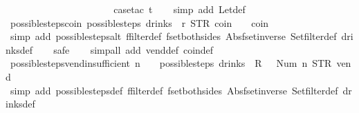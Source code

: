 \begin{isabellebody}
\ \ \ \ \ \ \ \ \ \ \ \ \ \ \ \ \ \ {\isacharparenright}{\isachardoublequoteclose}\isanewline
%
\isadelimproof
\ \ %
\endisadelimproof
%
\isatagproof
{}\isamarkupfalse%
\ {\isacharparenleft}case{\isacharunderscore}tac\ t{\isacharparenright}\isanewline
\ \ \isamarkupfalse%
\ {\isacharparenleft}simp\ add{\isacharcolon}\ Let{\isacharunderscore}def{\isacharparenright}%
\endisatagproof
{\isafoldproof}%
%
\isadelimproof
\isanewline
%
\endisadelimproof
\isanewline
{}\isamarkupfalse%
\ possible{\isacharunderscore}steps{\isacharunderscore}coin{\isacharcolon}\ {\isachardoublequoteopen}possible{\isacharunderscore}steps\ drinks\ {}\ r\ STR\ {\isacharprime}{\isacharprime}coin{\isacharprime}{\isacharprime}\ {\isacharbrackleft}{\isacharbrackright}\ {\isacharequal}\ {\isacharbraceleft}{\isacharbar}{\isacharparenleft}{}{\isacharcomma}\ coin{\isacharparenright}{\isacharbar}{\isacharbraceright}{\isachardoublequoteclose}\isanewline
%
\isadelimproof
\ \ %
\endisadelimproof
%
\isatagproof
{}\isamarkupfalse%
\ {\isacharparenleft}simp\ add{\isacharcolon}\ possible{\isacharunderscore}steps{\isacharunderscore}alt\ ffilter{\isacharunderscore}def\ fset{\isacharunderscore}both{\isacharunderscore}sides\ Abs{\isacharunderscore}fset{\isacharunderscore}inverse\ Set{\isachardot}filter{\isacharunderscore}def\ drinks{\isacharunderscore}def{\isacharparenright}\isanewline
\ \ \isamarkupfalse%
\ safe\isanewline
\ \ \isamarkupfalse%
\ {\isacharparenleft}simp{\isacharunderscore}all\ add{\isacharcolon}\ vend{\isacharunderscore}def\ coin{\isacharunderscore}def{\isacharparenright}%
\endisatagproof
{\isafoldproof}%
%
\isadelimproof
\isanewline
%
\endisadelimproof
\isanewline
{}\isamarkupfalse%
\ possible{\isacharunderscore}steps{\isacharunderscore}vend{\isacharunderscore}insufficient{\isacharcolon}\ {\isachardoublequoteopen}n\ {\isasymle}\ {}\ {\isasymLongrightarrow}\ possible{\isacharunderscore}steps\ drinks\ {}\ {\isacharless}R\ {}\ {\isacharcolon}{\isacharequal}\ Num\ n{\isachargreater}\ STR\ {\isacharprime}{\isacharprime}vend{\isacharprime}{\isacharprime}\ {\isacharbrackleft}{\isacharbrackright}\ {\isacharequal}\ {\isacharbraceleft}{\isacharbar}{\isacharbar}{\isacharbraceright}{\isachardoublequoteclose}\isanewline
%
\isadelimproof
\ \ %
\endisadelimproof
%
\isatagproof
{}\isamarkupfalse%
\ {\isacharparenleft}simp\ add{\isacharcolon}\ possible{\isacharunderscore}steps{\isacharunderscore}def\ ffilter{\isacharunderscore}def\ fset{\isacharunderscore}both{\isacharunderscore}sides\ Abs{\isacharunderscore}fset{\isacharunderscore}inverse\ Set{\isachardot}filter{\isacharunderscore}def\ drinks{\isacharunderscore}def{\isacharparenright}\isanewline

\end{isabellebody}
